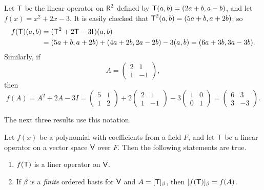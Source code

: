 \begin{example} \label{example e.2}
Let \(\textsf{T}\) be the linear operator on \(\textsf{R}^2\) defined by \(\textsf{T}(a, b) = (2a + b, a - b)\), and let \(f(x) = x^2 + 2x - 3\).
It is easily checked that \(\textsf{T}^2(a, b) = (5a + b, a + 2b)\); so
\begin{align*}
    f(\textsf{T})(a, b) & = (\textsf{T}^2 + 2\textsf{T} - 3\textsf{I}_{_{}})(a, b) \\
        & = (5a + b, a + 2b) + (4a + 2b, 2a - 2b) - 3(a, b) = (6a + 3b, 3a - 3b).
\end{align*}
Similarly, if
\[
    A = \begin{pmatrix} 2 & 1 \\ 1 & -1 \end{pmatrix},
\]
then
\[
    f(A) = A^2 + 2A - 3I = \begin{pmatrix} 5 & 1 \\ 1 & 2 \end{pmatrix} + 2 \begin{pmatrix} 2 & 1 \\ 1 & -1 \end{pmatrix} - 3 \begin{pmatrix} 1 & 0 \\ 0 & 1 \end{pmatrix} = \begin{pmatrix} 6 & 3 \\ 3 & -3 \end{pmatrix}.
\]
\end{example}

The next three results use this notation.

\begin{appendix theorem} \label{thm e.3}
Let \(f(x)\) be a polynomial with coefficients from a field \(F\), and let \(\textsf{T}\) be a linear operator on a vector space \(\textsf{V}\) over \(F\).
Then the following statements are true.
\begin{enumerate}
\item \(f(\textsf{T})\) is a liner operator on \(\textsf{V}\).
\item If \(\beta\) is a \emph{finite} ordered basis for \(\textsf{V}\) and \(A = [\textsf{T}]_{\beta}\), then \([f(\textsf{T})]_{\beta} = f(A)\).
\end{enumerate}
\end{appendix theorem}


